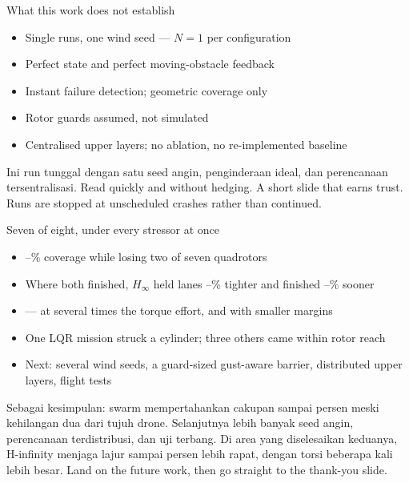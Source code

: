 \documentclass[aspectratio=169,11pt,t]{beamer}
\begin{document}
\begin{frame}{What this work does not establish}
  \begin{itemize}\bulletgap
    \item Single runs, one wind seed --- $N=1$ per configuration
    \item Perfect state and perfect moving-obstacle feedback
    \item Instant failure detection; geometric coverage only
    \item Rotor guards assumed, not simulated
    \item Centralised upper layers; no ablation, no re-implemented baseline
  \end{itemize}
    {Ini run tunggal dengan satu seed angin, penginderaan ideal, dan perencanaan tersentralisasi.}
    {Read quickly and without hedging. A short slide that earns trust. Runs
        are stopped at unscheduled crashes rather than continued.}
\end{frame}

\begin{frame}{Seven of eight, under every stressor at once}
  \begin{itemize}\bulletgap
    \item \CovMin--\CovMax\% coverage while losing two of seven quadrotors
    \item Where both finished, $H_\infty$ held lanes \LatRedMin--\LatRedMax\%
          tighter and finished \TimeRedMin--\TimeRedMax\% sooner
    \item --- at several times the torque effort, and with smaller margins
    \item One LQR mission struck a cylinder; three others came within rotor reach
    \item Next: several wind seeds, a guard-sized gust-aware barrier, distributed
          upper layers, flight tests
  \end{itemize}
    {Sebagai kesimpulan: swarm mempertahankan cakupan \CovMin\space sampai \CovMax\space persen meski kehilangan dua dari tujuh drone. Selanjutnya lebih banyak seed angin, perencanaan terdistribusi, dan uji terbang. Di area yang diselesaikan keduanya, H-infinity menjaga lajur \LatRedMin\space sampai \LatRedMax\space persen lebih rapat, dengan torsi beberapa kali lebih besar.}
    {Land on the future work, then go straight to the thank-you slide.}
\end{frame}
\end{document}
